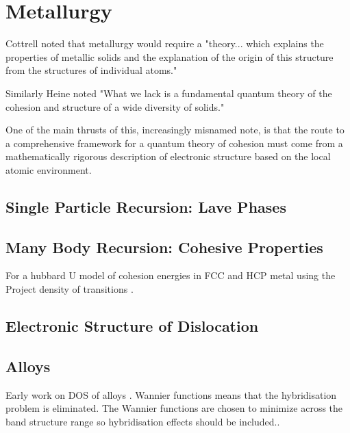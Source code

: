 \chapter{Metallurgy}
  Cottrell noted that metallurgy would require a "theory... which explains
the properties of metallic solids and the explanation of the origin of this
structure from the structures of individual atoms." 

Similarly Heine noted "What we lack is a fundamental quantum 
theory of the cohesion and structure of a wide diversity of solids." 

One of the main thrusts of this, increasingly misnamed note, is that the route
to a comprehensive framework for a quantum theory of cohesion must come
from a mathematically rigorous description of electronic structure based
on the local atomic environment. 

\section{Single Particle Recursion: Lave Phases}

\section{Many Body Recursion: Cohesive Properties}
For a hubbard U model of cohesion energies in FCC and HCP metal using the Project density of transitions
\cite{haydock14}.

\section{Electronic Structure of Dislocation}
\cite{paidar81}

\section{Alloys}

Early work on DOS of alloys \cite{cubiotti77}. Wannier functions means that the hybridisation problem
is eliminated. The Wannier functions are chosen to minimize across the band structure range so hybridisation effects
should be included..

